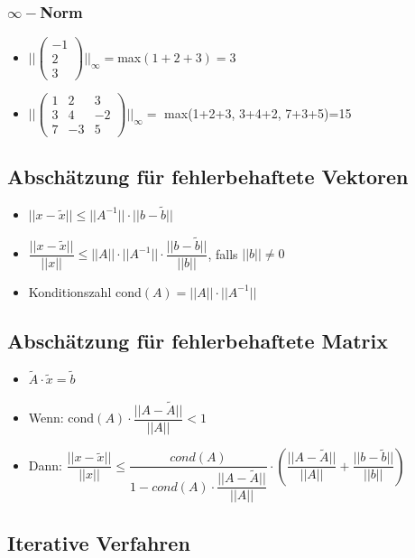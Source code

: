 \documentclass[8pt,a4paper]{scrartcl}
\begin{document}
\begin{multicols*}{3}
				\subsubsection{$\infty-$Norm}			
					\begin{itemize}\itemsep0pt	
						\item $||\begin{pmatrix}-1\\2\\3\end{pmatrix}||_{\infty} = $max$(1+2+3)=3$
						\item $||\begin{pmatrix}1&2&3\\3&4&-2\\7&-3&5\end{pmatrix}||_{\infty} = $ max(1+2+3, 3+4+2, 7+3+5)=15
					\end{itemize}
			
			\subsection{Abschätzung für fehlerbehaftete Vektoren}
				\begin{itemize}\itemsep0pt	
					\item $||x-\tilde{x}|| \leq ||A^{-1}||\cdot ||b-\tilde{b}||$
					\item $\dfrac{||x-\tilde{x}||}{||x||} \leq ||A||\cdot ||A^{-1}||\cdot \dfrac{||b-\tilde{b}||}{||b||}$, falls $||b||\neq0$
					\item Konditionszahl cond$(A) = ||A||\cdot ||A^{-1}||$
				\end{itemize}

			\subsection{Abschätzung für fehlerbehaftete Matrix}
			\begin{itemize}\itemsep0pt	
				\item $\tilde{A} \cdot \tilde{x} = \tilde{b}$
				\item Wenn: cond$(A)\cdot \dfrac{||A-\tilde{A}||}{||A||} < 1$
				\item Dann: $\dfrac{||x-\tilde{x}||}{||x||} \leq \dfrac{cond(A)}{1-cond(A)\cdot \dfrac{||A-\tilde{A}||}{||A||}}\cdot (\dfrac{||A-\tilde{A}||}{||A||} + \dfrac{||b-\tilde{b}||}{||b||} ) $
					
				\end{itemize}
			

		\subsection{Iterative Verfahren}
		

\end{multicols*}
\end{document}
